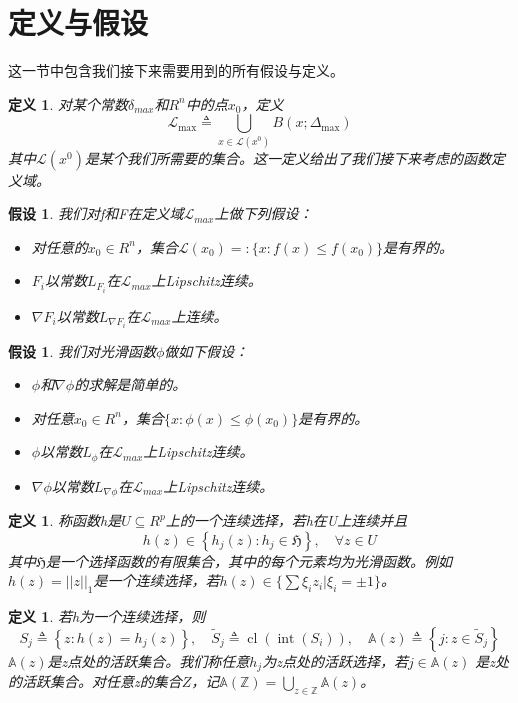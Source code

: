 \documentclass[macfonts]{njuthesis}
\newtheorem{defn}[thm]{定义}
\newtheorem{asp}[thm]{假设}
\begin{document}
\section{定义与假设}
这一节中包含我们接下来需要用到的所有假设与定义。

\begin{defn}
对某个常数$\delta_{max}$和$R^n$中的点$x_0$，定义
$$
\mathcal{L}_{\max } \triangleq \bigcup_{x \in \mathcal{L}\left(x^{0}\right)} B \left(x ; \Delta_{\max }\right)
$$
其中$\mathcal{L}\left(x^{0}\right)$是某个我们所需要的集合。这一定义给出了我们接下来考虑的函数定义域。
\end{defn}

\begin{asp}
\label{aspF}
我们对f和F在定义域$\mathcal{L}_{max}$上做下列假设：
\begin{itemize}
\item 对任意的$x_0 \in R^n$，集合$\mathcal{L}(x_0)=:\{x:f(x)\leq f(x_0)\}$是有界的。
\item $F_i$以常数$L_{F_i}$在$\mathcal{L}_{max}$上Lipschitz连续。
\item $\nabla F_i$以常数$L_{\nabla F_i}$在$\mathcal{L}_{max}$上连续。
\end{itemize}
\end{asp}

\begin{asp}
我们对光滑函数$\phi$做如下假设：
\begin{itemize}
\item $\phi$和$\nabla\phi$的求解是简单的。
\item 对任意$x_0 \in R^n$，集合$\{x:\phi(x)\leq \phi(x_0)\}$是有界的。
\item $\phi$以常数$L_{\phi}$在$\mathcal{L}_{max}$上Lipschitz连续。
\item $\nabla \phi$以常数$L_{\nabla\phi}$在$\mathcal{L}_{max}$上Lipschitz连续。
\end{itemize}
\end{asp}

\begin{defn}
称函数h是$U \subseteq R^{p}$上的一个连续选择，若h在U上连续并且
$$
h(z) \in\left\{h_{j}(z): h_{j} \in \mathfrak{H}\right\}, \quad \forall z \in U
$$
其中$\mathfrak{H}$是一个选择函数的有限集合，其中的每个元素均为光滑函数。例如$h(z)=||z||_1$是一个连续选择，若$h(z)\in \{\sum\xi_i z_i| \xi_i=\pm1\}$。
\end{defn}

\begin{defn}
若h为一个连续选择，则
$$
S_{j} \triangleq\left\{z: h(z)=h_{j}(z)\right\}, \quad \tilde{S}_{j} \triangleq \operatorname{cl}\left(\operatorname{int}\left(S_{i}\right)\right), \quad \mathbb{A}(z) \triangleq\left\{j: z \in \tilde{S}_{j}\right\}
$$
$\mathbb{A}(z)$是z点处的活跃集合。我们称任意$h_j$为z点处的活跃选择，若$j\in \mathbb{A}(z)$ 是z处的活跃集合。对任意z的集合$Z$，记$\mathbb{A}(\mathbb{Z})=\bigcup_{z \in \mathbb{Z}} \mathbb{A}(z)$。
\end{defn}
\end{document}
